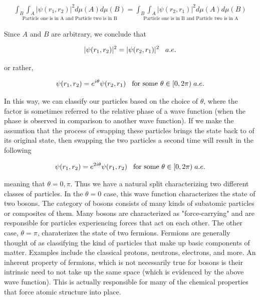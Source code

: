 \documentclass[10pt]{ucthesis}
\begin{document}
\begin{equation}
	\begin{aligned}
		\underset{\text{Particle one is in A and Particle two is in B}}{\int_B \int_A |\psi(r_1,r_2)|^2 d\mu(A)d\mu(B)} = \underset{\text{Particle one is in B and Particle two is in A}}{\int_B \int_A |\psi(r_2,r_1)|^2 d\mu(A)d\mu(B)}
	\end{aligned}
\end{equation}

Since $A$ and $B$ are arbitrary, we conclude that 

\begin{equation}
	\begin{aligned}
		|\psi(r_1,r_2)|^2 = |\psi(r_2,r_1)|^2 \hspace{3mm}a.e.
	\end{aligned}
\end{equation}

or rather,

\begin{equation}
	\begin{aligned}
		\psi(r_1,r_2) = e^{i\theta} \psi(r_2,r_1) \hspace{3mm}\text{for some }\theta\in[0,2\pi) \hspace{1mm} a.e.
	\end{aligned}
\end{equation}

In this way, we can classify our particles based on the choice of $\theta$, where the factor is sometimes referred to the relative phase of a wave function (when the phase is observed in comparison to another wave function). If we make the assumtion that the process of swapping these particles brings the state back to of its original state, then swapping the two particles a second time will result in the following 

\begin{equation}
	\begin{aligned}
		\psi(r_1,r_2) = e^{2i\theta} \psi(r_1,r_2) \hspace{3mm}\text{for some }\theta\in[0,2\pi) \hspace{1mm} a.e.
	\end{aligned}
\end{equation}

meaning that $\theta = 0,\pi$. Thus we have a natural split characterizing two different classes of particles. In the $\theta=0$ case, this wave function characterizes the state of two bosons. The category of bosons consists of many kinds of subatomic particles or composites of them. Many bosons are characterized as "force-carrying" and are responsible for particles experiencing forces that act on each other. The other case, $\theta=\pi$, charaterizes the state of two fermions. Fermions are generally thought of as classifying the kind of particles that make up basic components of matter. Examples include the classical protons, neutrons, electrons, and more. An inherent property of fermions, which is not necessarily true for bosons is their intrinsic need to not take up the same space (which is evidenced by the above wave function). This is actually responsible for many of the chemical properties that force atomic structure into place.
\end{document}
